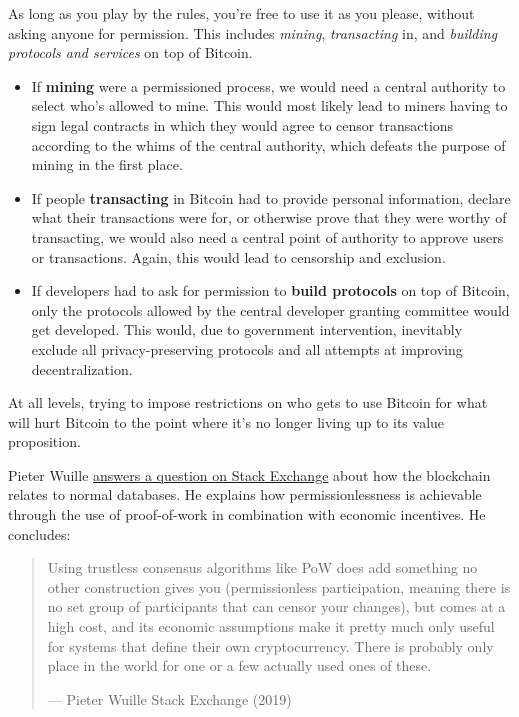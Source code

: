 As long as you play by the rules, you're free to use it as you please,
without asking anyone for permission. This includes \emph{mining},
\emph{transacting} in, and \emph{building protocols and services} on top
of Bitcoin.

\begin{itemize}
\item
  If \textbf{mining} were a permissioned process, we would need a
  central authority to select who's allowed to mine. This would most
  likely lead to miners having to sign legal contracts in which they
  would agree to censor transactions according to the whims of the
  central authority, which defeats the purpose of mining in the first
  place.
\item
  If people \textbf{transacting} in Bitcoin had to provide personal
  information, declare what their transactions were for, or otherwise
  prove that they were worthy of transacting, we would also need a
  central point of authority to approve users or transactions. Again,
  this would lead to censorship and exclusion.
\item
  If developers had to ask for permission to \textbf{build protocols} on
  top of Bitcoin, only the protocols allowed by the central developer
  granting committee would get developed. This would, due to government
  intervention, inevitably exclude all privacy-preserving protocols and
  all attempts at improving decentralization.
\end{itemize}

At all levels, trying to impose restrictions on who gets to use Bitcoin
for what will hurt Bitcoin to the point where it's no longer living up
to its value proposition.

Pieter Wuille
\href{https://bitcoin.stackexchange.com/a/92055/69518}{answers a
question on Stack Exchange} about how the blockchain relates to normal
databases. He explains how permissionlessness is achievable through the
use of proof-of-work in combination with economic incentives. He
concludes:

\begin{quote}
Using trustless consensus algorithms like PoW does add something no
other construction gives you (permissionless participation, meaning
there is no set group of participants that can censor your changes), but
comes at a high cost, and its economic assumptions make it pretty much
only useful for systems that define their own cryptocurrency. There is
probably only place in the world for one or a few actually used ones of
these.

---  Pieter Wuille Stack Exchange (2019)
\end{quote}

